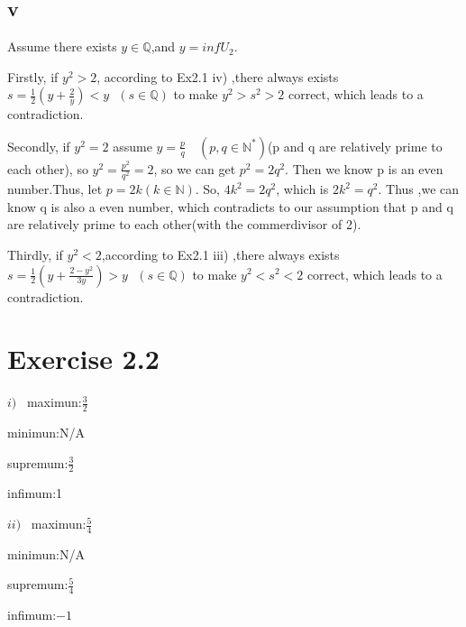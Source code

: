 \documentclass[11pt,twoside,a4paper]{article}
\begin{document}
\subsection{v}
Assume there exists $y \in \mathbb{Q}$,and $y=infU{_2}$. \par\noindent Firstly, if $y^2>2$, according to Ex2.1 iv) ,there always exists $\displaystyle s=\frac{1}{2}(y+\frac{2}{y})<y\,\,\,\,(s\in  \mathbb{Q})$ to make $y^2>s^2>2$ correct, which leads to a contradiction.
\par\noindent
Secondly, if $y^2=2$ assume $\displaystyle y = \frac{p}{q}\quad (p,q\in  \mathbb{N}^*)$(p and q are relatively prime to each other), so $\displaystyle y^2=\frac{p^2}{q^2}=2$, so we can get $p^2=2q^2$. Then we know p is an even number.Thus, let  $p=2k(k\in  \mathbb{N})$. So, $4k^2=2q^2$, which is  $2k^2=q^2$. Thus ,we can know q is also a even number, which contradicts to our assumption that p and q are relatively prime to each other(with the commerdivisor of 2).
\par\noindent
Thirdly, if $y^2<2$,according to Ex2.1 iii) ,there always exists $\displaystyle s=\frac{1}{2}(y+\frac{2-y^2}{3y})>y\,\,\,\,(s\in  \mathbb{Q})$ to make $y^2<s^2<2$ correct, which leads to a contradiction.




\section{Exercise 2.2}
\begin{multicols}{2}
$i)\,\,\,\,\,$maximun:$\displaystyle\frac{3}{2}$\par  minimun:N/A \par supremum:$\displaystyle\frac{3}{2}$ \par infimum:1
\end{multicols}
\begin{multicols}{2}
$ii)\,\,\,\,\,$maximun:$\displaystyle\frac{5}{4}$\par  minimun:N/A \par supremum:$\displaystyle\frac{5}{4}$ \par infimum:$-1$
\end{multicols}



\end{document}
